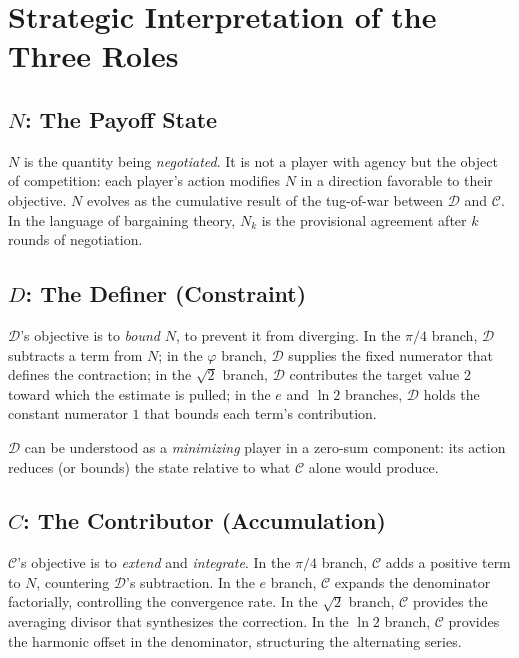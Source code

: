 \documentclass[12pt]{article}
\theoremstyle{definition}
\theoremstyle{remark}
\begin{document}
\section{Strategic Interpretation of the Three Roles}
\label{sec:roles}

\subsection{\texorpdfstring{$N$}{N}: The Payoff State}

$N$ is the quantity being \emph{negotiated}.  It is not a player with agency but the
object of competition: each player's action modifies $N$ in a direction favorable to
their objective.  $N$ evolves as the cumulative result of the tug-of-war between
$\mathcal{D}$ and $\mathcal{C}$.  In the language of bargaining theory, $N_k$ is the
provisional agreement after $k$ rounds of negotiation.

\subsection{\texorpdfstring{$D$}{D}: The Definer (Constraint)}

$\mathcal{D}$'s objective is to \emph{bound} $N$, to prevent it from diverging.
In the $\pi/4$ branch, $\mathcal{D}$ subtracts a term from $N$; in the $\varphi$
branch, $\mathcal{D}$ supplies the fixed numerator that defines the contraction; in the
$\sqrt{2}$ branch, $\mathcal{D}$ contributes the target value $2$ toward which the
estimate is pulled; in the $e$ and $\ln 2$ branches, $\mathcal{D}$ holds the constant
numerator $1$ that bounds each term's contribution.

$\mathcal{D}$ can be understood as a \emph{minimizing} player in a zero-sum component:
its action reduces (or bounds) the state relative to what $\mathcal{C}$ alone would
produce.

\subsection{\texorpdfstring{$C$}{C}: The Contributor (Accumulation)}

$\mathcal{C}$'s objective is to \emph{extend} and \emph{integrate}.  In the $\pi/4$
branch, $\mathcal{C}$ adds a positive term to $N$, countering $\mathcal{D}$'s
subtraction.  In the $e$ branch, $\mathcal{C}$ expands the denominator factorially,
controlling the convergence rate.  In the $\sqrt{2}$ branch, $\mathcal{C}$ provides the
averaging divisor that synthesizes the correction.  In the $\ln 2$ branch, $\mathcal{C}$
provides the harmonic offset in the denominator, structuring the alternating series.
\end{document}
